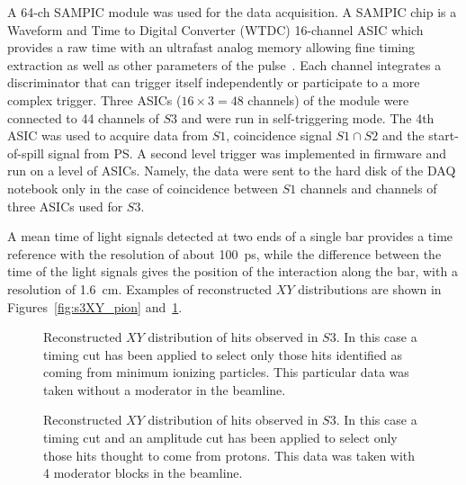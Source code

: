 A 64-ch SAMPIC  module was used for the data acquisition. A SAMPIC chip is a Waveform and Time to Digital Converter (WTDC) 16-channel ASIC which provides a raw time with an ultrafast analog memory allowing fine timing extraction as well as other parameters of the pulse~\cite{SAMPIC}. Each channel integrates a discriminator that can trigger itself independently or participate to a more complex trigger. 
Three ASICs ($16\times3=48$ channels) of the module were connected to 44 channels of $S3$ and were run in self-triggering mode. The 4th ASIC was used to acquire data from $S1$, coincidence signal $S1\cap S2$ and the start-of-spill signal from PS. A second level trigger was implemented in firmware and run on a level of ASICs. 
Namely, the data were sent to the hard disk of the DAQ notebook only in the case of coincidence between $S1$ channels and channels of three ASICs used for $S3$.


A mean time of light signals detected at two ends of a single bar provides a time reference with the resolution of about 100~ps, while the difference between the time of the light signals gives the position of the interaction along the bar, with a resolution of 1.6~cm. Examples of reconstructed $XY$ distributions are shown in Figures~\ref{fig:s3XY_pion} and~\ref{fig:s3XY_proton}.



\begin{figure}[t]
	\begin{minipage}[t]{0.49\textwidth}
		\centering
		\begin{adjustbox}{max totalsize={\textwidth}{.5\textheight},center}
			
		\end{adjustbox}
		\caption{Reconstructed $XY$ distribution of hits observed in $S3$. In this case a timing cut has been applied to select only those hits identified as coming from minimum ionizing particles. This particular data was taken without a moderator in the beamline.}
		\label{fig:s3XY_pion}
	\end{minipage} 	
	\hfill
	\begin{minipage}[t]{0.49\textwidth}
		\centering
		\begin{adjustbox}{max totalsize={\textwidth}{.5\textheight},center}
			
		\end{adjustbox}
		\caption{Reconstructed $XY$ distribution of hits observed in $S3$. In this case a timing cut and an amplitude cut has been applied to select only those hits thought to come from protons. This data was taken with 4 moderator blocks in the beamline.}
		\label{fig:s3XY_proton}
	\end{minipage}
\end{figure}
  

